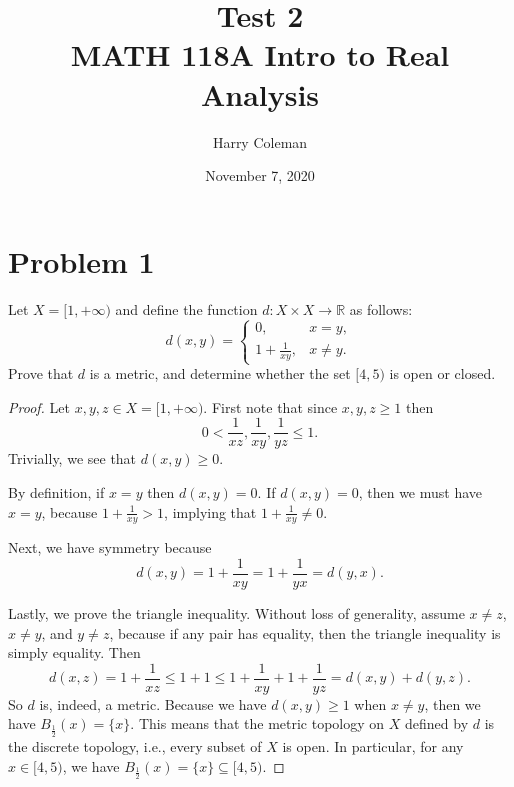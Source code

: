\documentclass[12pt]{article}
\newenvironment{problem}
    {\begin{lrbox}{\mybox}\begin{minipage}{\textwidth-10pt}}
    {\end{minipage}\end{lrbox}\framebox[6.5in]{\usebox{\mybox}}}
\newcommand{\<}{\left\langle}
\renewcommand{\>}{\right\rangle}
\newcommand{\R}{\mathbb{R}}
\begin{document}
 
\title{Test 2\\
    \large MATH 118A Intro to Real Analysis
}
\author{Harry Coleman}
\date{November 7, 2020}
\maketitle

\section*{Problem 1}
\begin{problem}
    Let $X = [1,+\infty)$ and define the function $d:X\times X\to \R$ as follows:
    \begin{equation}
    d(x,y) = \left \{ \begin{array}{lr}
    0,& x=y,\\
    1+\frac{1}{xy},& x\ne y.
    \end{array}\right .
    \end{equation}
    Prove that $d$ is a metric, and determine whether the set $[4,5)$ is open or closed.  
\end{problem}

\begin{proof}
    Let $x,y,z\in X = [1,+\infty)$. First note that since $x,y,z\geq 1$ then
    \[0 < \frac1{xz},\frac1{xy},\frac1{yz} \leq 1.\]
    Trivially, we see that $d(x,y)\geq 0$.
    
    By definition, if $x=y$ then $d(x,y) = 0$. If $d(x,y)=0$, then we must have $x=y$, because $1+\frac1{xy}>1$, implying that $1+\frac1{xy}\ne 0$.
    
    Next, we have symmetry because
    \[d(x,y) = 1+ \frac1{xy} = 1 + \frac1{yx} = d(y,x).\]
    
    Lastly, we prove the triangle inequality. Without loss of generality, assume $x\ne z$, $x\ne y$, and $y\ne z$, because if any pair has equality, then the triangle inequality is simply equality. Then
    \[d(x,z) = 1 + \frac1{xz} \leq 1 + 1 \leq 1 + \frac1{xy} + 1 + \frac1{yz} = d(x,y) + d(y,z).\]
    So $d$ is, indeed, a metric. Because we have $d(x,y)\geq 1$ when $x\ne y$, then we have $B_\frac12(x) = \{x\}$. This means that the metric topology on $X$ defined by $d$ is the discrete topology, i.e., every subset of $X$ is open. In particular, for any $x\in[4,5)$, we have $B_\frac12(x) = \{x\} \subseteq [4,5)$.
    
\end{proof}
\end{document}
